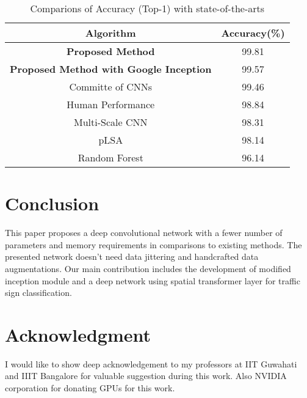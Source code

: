 \documentclass[conference]{IEEEtran}
\begin{document}
\begin{table}[h]
\caption{Comparions of Accuracy (Top-1) with state-of-the-arts}
\label{tab:accuracy}
\begin{center}
\begin{tabular}{|c|c|}
\hline
Algorithm & Accuracy(\%)\\
\hline
\textbf{Proposed Method} & 99.81 \\
\hline
\textbf{Proposed Method with Google Inception} & 99.57\\
\hline
Committe of CNNs \cite{committe} & 99.46\\
\hline
Human Performance \cite{gtsrb} & 98.84\\
\hline
Multi-Scale CNN \cite{multi} & 98.31\\
\hline
pLSA \cite{plsa} & 98.14\\
\hline
Random Forest \cite{rf} & 96.14\\
\hline
\end{tabular}
\end{center}
\end{table}


\section{Conclusion}
 This paper proposes a deep convolutional network with a fewer number of parameters and memory requirements in comparisons to existing methods. The presented network doesn't need data jittering and handcrafted data augmentations. Our main contribution includes the development of modified inception module and a deep network using spatial transformer layer for traffic sign classification.


\section*{Acknowledgment}
I would like to show deep acknowledgement to my professors at IIT Guwahati and IIIT Bangalore for valuable suggestion during this work. Also NVIDIA corporation for donating GPUs for this work.
\end{document}
